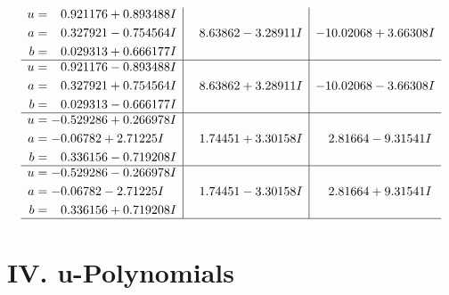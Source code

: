 \documentclass[1p]{elsarticle_modified}
\theoremstyle{definition}
\begin{document}
$$\begin{array}{c|c|c}
\begin{aligned}
u &= \phantom{-}0.921176 + 0.893488 I \\
a &= \phantom{-}0.327921 - 0.754564 I \\
b &= \phantom{-}0.029313 + 0.666177 I\end{aligned}
 & \phantom{-}8.63862 - 3.28911 I & -10.02068 + 3.66308 I \\ \hline\begin{aligned}
u &= \phantom{-}0.921176 - 0.893488 I \\
a &= \phantom{-}0.327921 + 0.754564 I \\
b &= \phantom{-}0.029313 - 0.666177 I\end{aligned}
 & \phantom{-}8.63862 + 3.28911 I & -10.02068 - 3.66308 I \\ \hline\begin{aligned}
u &= -0.529286 + 0.266978 I \\
a &= -0.06782 + 2.71225 I \\
b &= \phantom{-}0.336156 - 0.719208 I\end{aligned}
 & \phantom{-}1.74451 + 3.30158 I & \phantom{-}2.81664 - 9.31541 I \\ \hline\begin{aligned}
u &= -0.529286 - 0.266978 I \\
a &= -0.06782 - 2.71225 I \\
b &= \phantom{-}0.336156 + 0.719208 I\end{aligned}
 & \phantom{-}1.74451 - 3.30158 I & \phantom{-}2.81664 + 9.31541 I\\
 \hline 
 \end{array}$$\newpage
\newpage\renewcommand{\arraystretch}{1}
\centering \section*{ IV. u-Polynomials}
\end{document}
